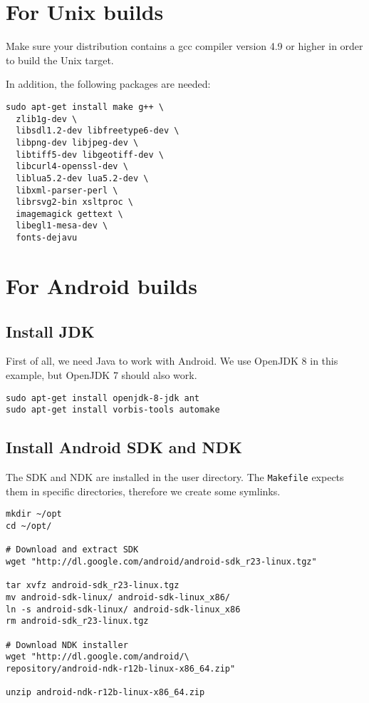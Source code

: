 \section{For Unix builds}

Make sure your distribution contains a gcc compiler version 4.9 or higher in order to build the Unix target.

In addition, the following packages are needed:

\begin{verbatim}
sudo apt-get install make g++ \
  zlib1g-dev \
  libsdl1.2-dev libfreetype6-dev \
  libpng-dev libjpeg-dev \
  libtiff5-dev libgeotiff-dev \
  libcurl4-openssl-dev \
  liblua5.2-dev lua5.2-dev \
  libxml-parser-perl \
  librsvg2-bin xsltproc \
  imagemagick gettext \
  libegl1-mesa-dev \
  fonts-dejavu
\end{verbatim}

\section{For Android  builds}
\subsection{Install JDK}
First of all, we need Java to work with Android. We use OpenJDK 8 in this example, but OpenJDK 7 should also work.

\begin{verbatim}
sudo apt-get install openjdk-8-jdk ant
sudo apt-get install vorbis-tools automake
\end{verbatim}

\subsection{Install Android SDK and NDK}

The SDK and NDK are installed in the user directory. The \texttt{Makefile} expects them in specific directories, therefore we create some symlinks.

\begin{verbatim}
mkdir ~/opt
cd ~/opt/

# Download and extract SDK
wget "http://dl.google.com/android/android-sdk_r23-linux.tgz"

tar xvfz android-sdk_r23-linux.tgz
mv android-sdk-linux/ android-sdk-linux_x86/
ln -s android-sdk-linux/ android-sdk-linux_x86
rm android-sdk_r23-linux.tgz

# Download NDK installer
wget "http://dl.google.com/android/\
repository/android-ndk-r12b-linux-x86_64.zip"

unzip android-ndk-r12b-linux-x86_64.zip
\end{verbatim}

